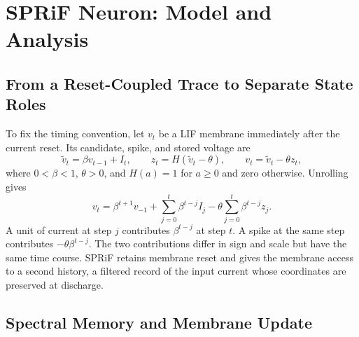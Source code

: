 \documentclass[letterpaper,journal]{IEEEtran}
\begin{document}
\section{SPRiF Neuron: Model and Analysis}
\label{sec:model}

\subsection{From a Reset-Coupled Trace to Separate State Roles}
\label{sec:motivation}

To fix the timing convention, let $v_t$ be a LIF membrane immediately after the current reset. Its candidate, spike, and stored voltage are
\begin{equation}
\widetilde v_t=\beta v_{t-1}+I_t,\qquad
z_t=H(\widetilde v_t-\theta),\qquad
v_t=\widetilde v_t-\theta z_t,
\label{eq:lif}
\end{equation}
where $0<\beta<1$, $\theta>0$, and $H(a)=1$ for $a\geq0$ and zero otherwise. Unrolling gives
\begin{equation}
v_t=\beta^{t+1}v_{-1}
+\sum_{j=0}^{t}\beta^{t-j} I_j
-\theta\sum_{j=0}^{t}\beta^{t-j}z_j.
\label{eq:lif_unrolled}
\end{equation}
A unit of current at step $j$ contributes $\beta^{t-j}$ at step $t$. A spike at the same step contributes $-\theta\beta^{t-j}$. The two contributions differ in sign and scale but have the same time course. SPRiF retains membrane reset and gives the membrane access to a second history, a filtered record of the input current whose coordinates are preserved at discharge.

\subsection{Spectral Memory and Membrane Update}
\label{sec:forward}
\end{document}
